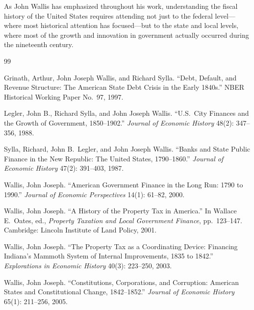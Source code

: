\documentclass[12pt]{article}
\begin{document}
As John Wallis has emphasized throughout his work, understanding the fiscal history of the United States requires attending not just to the federal level---where most historical attention has focused---but to the state and local levels, where most of the growth and innovation in government actually occurred during the nineteenth century.

\newpage

\begin{thebibliography}{99}

Grinath, Arthur, John Joseph Wallis, and Richard Sylla.
\newblock ``Debt, Default, and Revenue Structure: The American State Debt Crisis in the Early 1840s.''
\newblock NBER Historical Working Paper No.\ 97, 1997.

Legler, John B., Richard Sylla, and John Joseph Wallis.
\newblock ``U.S.\ City Finances and the Growth of Government, 1850--1902.''
\newblock \textit{Journal of Economic History} 48(2): 347--356, 1988.

Sylla, Richard, John B.\ Legler, and John Joseph Wallis.
\newblock ``Banks and State Public Finance in the New Republic: The United States, 1790--1860.''
\newblock \textit{Journal of Economic History} 47(2): 391--403, 1987.

Wallis, John Joseph.
\newblock ``American Government Finance in the Long Run: 1790 to 1990.''
\newblock \textit{Journal of Economic Perspectives} 14(1): 61--82, 2000.

Wallis, John Joseph.
\newblock ``A History of the Property Tax in America.''
\newblock In Wallace E.\ Oates, ed., \textit{Property Taxation and Local Government Finance}, pp.\ 123--147. Cambridge: Lincoln Institute of Land Policy, 2001.

Wallis, John Joseph.
\newblock ``The Property Tax as a Coordinating Device: Financing Indiana's Mammoth System of Internal Improvements, 1835 to 1842.''
\newblock \textit{Explorations in Economic History} 40(3): 223--250, 2003.

Wallis, John Joseph.
\newblock ``Constitutions, Corporations, and Corruption: American States and Constitutional Change, 1842--1852.''
\newblock \textit{Journal of Economic History} 65(1): 211--256, 2005.


\end{thebibliography}
\end{document}
